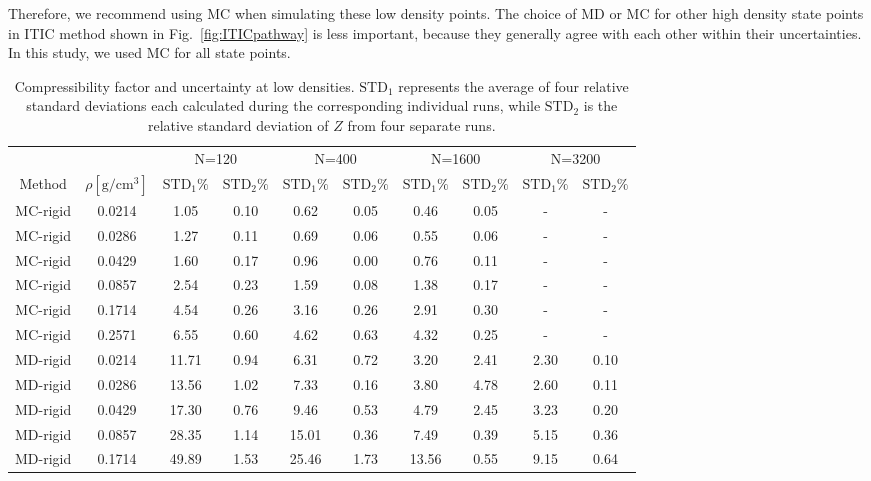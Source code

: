 \documentclass[5p,times]{elsarticle}
\begin{document}
Therefore, we recommend using MC when simulating these low density points. The choice of MD or MC for other high density state points in ITIC method shown in Fig.~\ref{fig:ITICpathway} is less important, because they generally agree with each other within their uncertainties. In this study, we used MC for all state points. 

\begin{table}[ht]
\centering
\caption{Compressibility factor and uncertainty at low densities. $\mathrm{STD}_1$ represents the average of four relative standard deviations each calculated during the corresponding individual runs, while $\mathrm{STD}_2$ is the relative standard deviation of $Z$ from four separate runs.}
\label{tab:FSE}
\begin{tabular}{cc|cc|cc|cc|cc}
       &        & \multicolumn{2}{c}{N=120} & \multicolumn{2}{c}{N=400} & \multicolumn{2}{c}{N=1600} & \multicolumn{2}{c}{N=3200} \\
Method & $\rho [\mathrm{g/cm^3}]$ & $\mathrm{STD}_1 \%$  & $\mathrm{STD}_2 \%$ & $\mathrm{STD}_1 \%$  & $\mathrm{STD}_2 \%$ & $\mathrm{STD}_1 \%$  & $\mathrm{STD}_2 \%$  & $\mathrm{STD}_1 \%$  & $\mathrm{STD}_2 \%$ \\
\hline
MC-rigid    & 0.0214 & 1.05   & 0.10 & 0.62   & 0.05 & 0.46  & 0.05 & -     & -    \\
MC-rigid    & 0.0286 & 1.27   & 0.11 & 0.69   & 0.06 & 0.55  & 0.06 & -     & -    \\
MC-rigid    & 0.0429 & 1.60   & 0.17 & 0.96   & 0.00 & 0.76  & 0.11 & -     & -    \\
MC-rigid    & 0.0857 & 2.54   & 0.23 & 1.59   & 0.08 & 1.38  & 0.17 & -     & -    \\
MC-rigid    & 0.1714 & 4.54   & 0.26 & 3.16   & 0.26 & 2.91  & 0.30 & -     & -    \\
MC-rigid    & 0.2571 & 6.55   & 0.60 & 4.62   & 0.63 & 4.32  & 0.25 & -     & -    \\
\hline
MD-rigid    & 0.0214 & 11.71  & 0.94 & 6.31   & 0.72 & 3.20  & 2.41 & 2.30  & 0.10 \\
MD-rigid    & 0.0286 & 13.56  & 1.02 & 7.33   & 0.16 & 3.80  & 4.78 & 2.60  & 0.11 \\
MD-rigid    & 0.0429 & 17.30  & 0.76 & 9.46   & 0.53 & 4.79  & 2.45 & 3.23  & 0.20 \\
MD-rigid    & 0.0857 & 28.35  & 1.14 & 15.01  & 0.36 & 7.49  & 0.39 & 5.15  & 0.36 \\
MD-rigid    & 0.1714 & 49.89  & 1.53 & 25.46  & 1.73 & 13.56 & 0.55 & 9.15  & 0.64 \\

\end{tabular}
\end{table}
\end{document}
